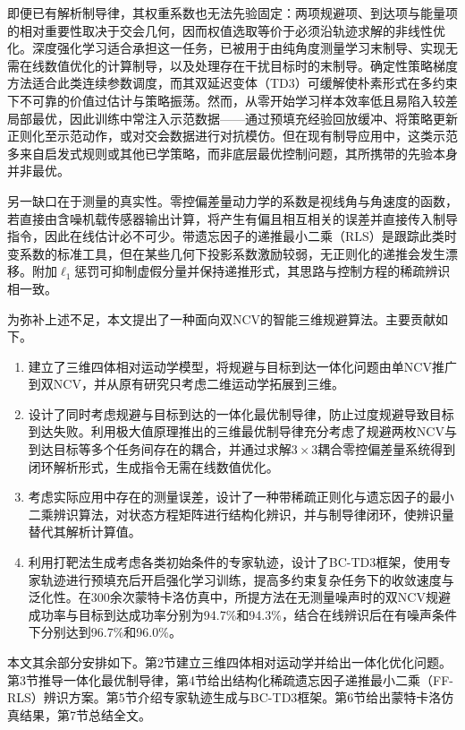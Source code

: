 即便已有解析制导律，其权重系数也无法先验固定：两项规避项、到达项与能量项的相对重要性取决于交会几何，因而权值选取等价于必须沿轨迹求解的非线性优化。深度强化学习适合承担这一任务，已被用于由纯角度测量学习末制导\cite{gaudet2020}、实现无需在线数值优化的计算制导\cite{he2021}，以及处理存在干扰目标时的末制导\cite{deng2023}。确定性策略梯度方法适合此类连续参数调度\cite{lillicrap2016}，而其双延迟变体（TD3）可缓解使朴素形式在多约束下不可靠的价值过估计与策略振荡\cite{fujimoto2018}。然而，从零开始学习样本效率低且易陷入较差局部最优，因此训练中常注入示范数据——通过预填充经验回放缓冲\cite{hester2018,vecerik2017}、将策略更新正则化至示范动作\cite{fujimoto2021}，或对交会数据进行对抗模仿\cite{hu2022,hui2025}。但在现有制导应用中，这类示范多来自启发式规则或其他已学策略，而非底层最优控制问题，其所携带的先验本身并非最优。

另一缺口在于测量的真实性。零控偏差量动力学的系数是视线角与角速度的函数，若直接由含噪机载传感器输出计算，将产生有偏且相互相关的误差并直接传入制导指令，因此在线估计必不可少\cite{liu2025}。带遗忘因子的递推最小二乘（RLS）是跟踪此类时变系数的标准工具\cite{paleologu2008,bruce2020}，但在某些几何下投影系数激励较弱，无正则化的递推会发生漂移。附加$\ell_1$惩罚可抑制虚假分量并保持递推形式\cite{angelosante2010}，其思路与控制方程的稀疏辨识相一致\cite{brunton2016}。

为弥补上述不足，本文提出了一种面向双NCV的智能三维规避算法。主要贡献如下。

\begin{enumerate}
\item 建立了三维四体相对运动学模型，将规避与目标到达一体化问题由单NCV推广到双NCV，并从原有研究只考虑二维运动学拓展到三维。
\item 设计了同时考虑规避与目标到达的一体化最优制导律，防止过度规避导致目标到达失败。利用极大值原理推出的三维最优制导律充分考虑了规避两枚NCV与到达目标等多个任务间存在的耦合，并通过求解$3\times 3$耦合零控偏差量系统得到闭环解析形式，生成指令无需在线数值优化。
\item 考虑实际应用中存在的测量误差，设计了一种带稀疏正则化与遗忘因子的最小二乘辨识算法，对状态方程矩阵进行结构化辨识，并与制导律闭环，使辨识量替代其解析计算值。
\item 利用打靶法生成考虑各类初始条件的专家轨迹，设计了BC-TD3框架，使用专家轨迹进行预填充后开启强化学习训练，提高多约束复杂任务下的收敛速度与泛化性。在300余次蒙特卡洛仿真中，所提方法在无测量噪声时的双NCV规避成功率与目标到达成功率分别为94.7\%和94.3\%，结合在线辨识后在有噪声条件下分别达到96.7\%和96.0\%。
\end{enumerate}

本文其余部分安排如下。第2节建立三维四体相对运动学并给出一体化优化问题。第3节推导一体化最优制导律，第4节给出结构化稀疏遗忘因子递推最小二乘（FF-RLS）辨识方案。第5节介绍专家轨迹生成与BC-TD3框架。第6节给出蒙特卡洛仿真结果，第7节总结全文。
